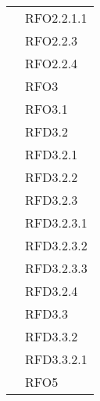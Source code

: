 \begin{longtable}{|>{\centering}m{10cm}|m{3cm}<{\centering}|}
& RFO2.2.1.1\\
& RFO2.2.3\\
& RFO2.2.4\\
& RFO3\\
& RFO3.1\\
& RFD3.2\\
& RFD3.2.1\\
& RFD3.2.2\\
& RFD3.2.3\\
& RFD3.2.3.1\\
& RFD3.2.3.2\\
& RFD3.2.3.3\\
& RFD3.2.4\\
& RFD3.3\\
& RFD3.3.2\\
& RFD3.3.2.1\\
& RFO5\\ \hline


\end{longtable}
